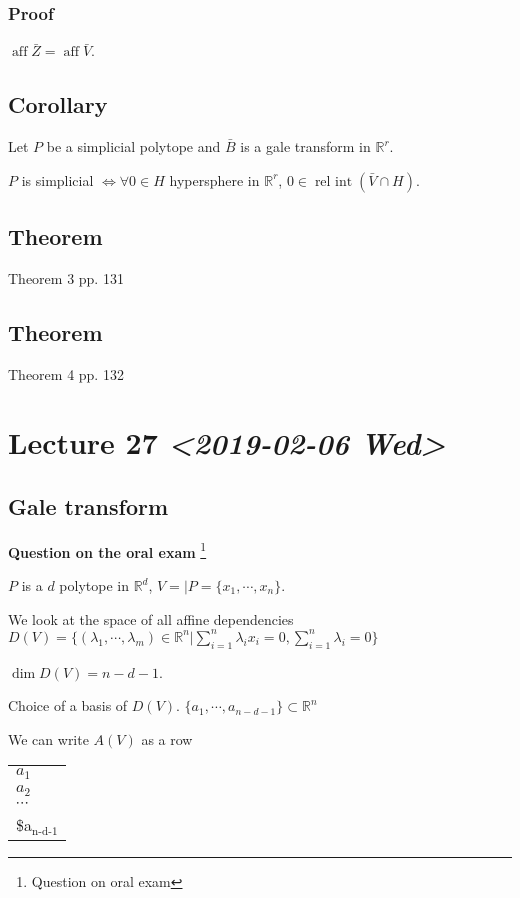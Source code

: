 \documentclass[11pt]{article}
\def\R{\mathbb{R}}
\def\aff{\operatorname{aff}}
\def\relint{\operatorname{rel\ int}}
\begin{document}
{{{\subsubsection{Proof}
\label{sec:org32d92c6}
\(\aff \bar{Z} = \aff \bar{V}\).
\subsection{Corollary}
\label{sec:org2c3f965}
Let \(P\) be a simplicial polytope and \(\bar{B}\) is a gale transform in \(\R^r\).

\(P\) is simplicial \(\iff \forall 0 \in H\) hypersphere in \(\R^r\), \(0 \in
   \relint (\bar{V} \cap H)\).
\subsection{Theorem}
\label{sec:org81b9bd1}
Theorem 3 pp. 131
\subsection{Theorem}
\label{sec:orgfab7ab6}
Theorem 4 pp. 132
\section{Lecture 27 \textit{<2019-02-06 Wed>}}
\label{sec:org4e12f34}
\subsection{Gale transform}
\label{sec:org41a8f5a}
\textbf{Question on the oral exam} \footnote{Question on oral exam}

\(P\) is a \(d\) polytope in \(\R^d\), \(V = \vert P = \{x_1, \cdots, x_n\}\).

We look at the space of all affine dependencies \(D(V) = \{(\lambda_1, \cdots,
   \lambda_m) \in \R^n \vert \sum_{i=1}^{n} \lambda_i x_i = 0, \sum_{i=1}^{n}
   \lambda_i = 0\}\)

\(\dim D(V) = n - d- 1\).

Choice of a basis of \(D(V)\). \(\{a_1, \cdots, a_{n-d-1}\} \subset \R^n\)

We can write \(A(V)\) as a row

\begin{center}
\begin{tabular}{l}
\(a_1\)\\
\(a_2\)\\
\(\cdots\)\\
\$a\(_{\text{n-d-1}}\)\\
\end{tabular}
\end{center}


}}}
\end{document}

